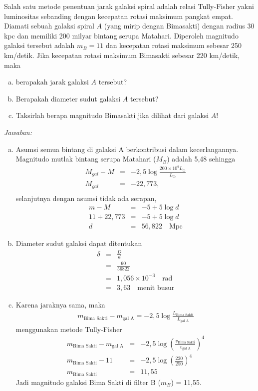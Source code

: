 \documentclass[11pt,fleqn, a4paper]{exam}
\begin{document}
\begin{questions}
\vspace{0.5cm}
\question Salah satu metode penentuan jarak galaksi spiral adalah relasi Tully-Fisher yakni luminositas sebanding dengan kecepatan rotasi maksimum pangkat empat. Diamati sebuah galaksi spiral $A$ (yang mirip dengan Bimasakti) dengan radius 30 kpc dan memiliki 200 milyar bintang serupa Matahari. Diperoleh magnitudo galaksi tersebut adalah $m_B=11$ dan kecepatan rotasi maksimum sebesar 250 km/detik. Jika kecepatan rotasi maksimum Bimasakti sebesar 220 km/detik, maka
\begin{enumerate}[(a)]
\item berapakah jarak galaksi $A$ tersebut?
\item Berapakah diameter sudut galaksi $A$ tersebut?
\item Taksirlah berapa magnitudo Bimasakti jika dilihat dari galaksi $A$!
\end{enumerate}

\textit{Jawaban:}
\begin{enumerate}[(a)]
\item Asumsi semua bintang di galaksi A berkontribusi dalam kecerlangannya. Magnitudo mutlak bintang serupa Matahari ($M_B$) adalah 5,48 sehingga
\begin{eqnarray*}
M_{gal} - M &=& -2,5 \log \frac{200 \times 10^9 L_{\odot}}{L_{\odot}}\\
M_{gal} &=& -22,773,\\
\end{eqnarray*}
selanjutnya dengan asumsi tidak ada serapan,
\begin{eqnarray*}
m - M &=& -5 + 5 \log d\\
11 + 22,773 &=& -5 + 5 \log d\\
d &=& 56,822 \quad \text{Mpc}
\end{eqnarray*}

\item Diameter sudut galaksi dapat ditentukan
\begin{eqnarray*}
\delta &=& \frac{D}{d}\\
&=& \frac{60}{56822} \\
&=& 1,056 \times 10^{-3} \quad \text{rad}\\
&=& 3,63 \quad \text{menit busur}
\end{eqnarray*}

\item Karena jaraknya sama, maka
\begin{eqnarray*} 
m_{\text{Bima Sakti}} - m_{\text{gal A}} = -2,5 \log \frac{L_{\text{Bima Sakti}}}{L_{\text{gal A}}}
\end{eqnarray*}
menggunakan metode Tully-Fisher
\begin{eqnarray*} 
m_{\text{Bima Sakti}} - m_{\text{gal A}} &=& -2,5 \log \left(\frac{v_{\text{Bima Sakti}}}{v_{\text{gal A}}}\right)^{4}\\
m_{\text{Bima Sakti}} - 11 &=& -2,5 \log \left( \frac{220}{250} \right)^{4}\\
m_{\text{Bima Sakti}} &=& 11,55
\end{eqnarray*}
Jadi magnitudo galaksi Bima Sakti di filter B  ($m_B$) = 11,55.
\end{enumerate}



\end{questions}
\end{document}
